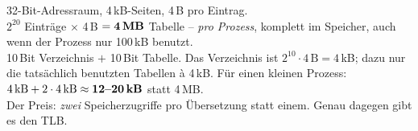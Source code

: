 \begin{bsp}
32-Bit-Adressraum, 4\,kB-Seiten, 4\,B pro Eintrag.\\
 $2^{20}$ Einträge $\times$ 4\,B $= \textbf{4\,MB}$ Tabelle --
\emph{pro Prozess}, komplett im Speicher, auch wenn der Prozess nur
100\,kB benutzt.\\
 10\,Bit Verzeichnis $+$ 10\,Bit Tabelle. Das
Verzeichnis ist $2^{10}\cdot 4\,\text{B} = 4\,$kB; dazu nur die
tatsächlich benutzten Tabellen à 4\,kB. Für einen kleinen Prozess:
$4\,\text{kB} + 2\cdot 4\,\text{kB} \approx \textbf{12--20\,kB}$ statt
4\,MB.\\[2pt]
\merkzeile Der Preis: \emph{zwei} Speicherzugriffe pro Übersetzung
statt einem. Genau dagegen gibt es den TLB.
\end{bsp}
